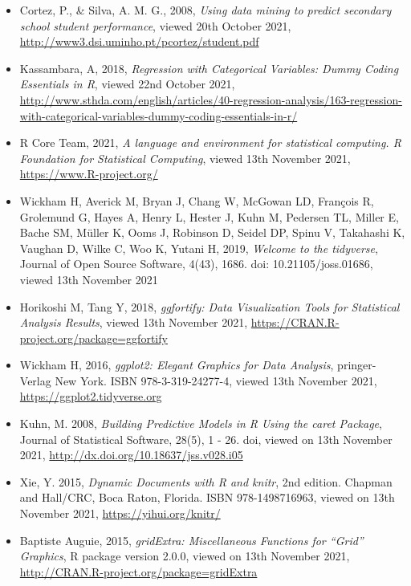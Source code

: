 \documentclass[letterpaper,9pt,twocolumn,twoside,]{pinp}
\begin{document}
\begin{itemize}
\item
  Cortez, P., \& Silva, A. M. G., 2008, \emph{Using data mining to
  predict secondary school student performance}, viewed 20th October
  2021, \url{http://www3.dsi.uminho.pt/pcortez/student.pdf}
\item
  Kassambara, A, 2018, \emph{Regression with Categorical Variables:
  Dummy Coding Essentials in R}, viewed 22nd October 2021,
  \url{http://www.sthda.com/english/articles/40-regression-analysis/163-regression-with-categorical-variables-dummy-coding-essentials-in-r/}
\item
  R Core Team, 2021, \emph{A language and environment for statistical
  computing. R Foundation for Statistical Computing}, viewed 13th
  November 2021, \url{https://www.R-project.org/}
\item
  Wickham H, Averick M, Bryan J, Chang W, McGowan LD, François R,
  Grolemund G, Hayes A, Henry L, Hester J, Kuhn M, Pedersen TL, Miller
  E, Bache SM, Müller K, Ooms J, Robinson D, Seidel DP, Spinu V,
  Takahashi K, Vaughan D, Wilke C, Woo K, Yutani H, 2019, \emph{Welcome
  to the tidyverse}, Journal of Open Source Software, 4(43), 1686. doi:
  10.21105/joss.01686, viewed 13th November 2021
\item
  Horikoshi M, Tang Y, 2018, \emph{ggfortify: Data Visualization Tools
  for Statistical Analysis Results}, viewed 13th November 2021,
  \url{https://CRAN.R-project.org/package=ggfortify}
\item
  Wickham H, 2016, \emph{ggplot2: Elegant Graphics for Data Analysis},
  pringer-Verlag New York. ISBN 978-3-319-24277-4, viewed 13th November
  2021, \url{https://ggplot2.tidyverse.org}
\item
  Kuhn, M. 2008, \emph{Building Predictive Models in R Using the caret
  Package}, Journal of Statistical Software, 28(5), 1 - 26. doi, viewed
  on 13th November 2021, \url{http://dx.doi.org/10.18637/jss.v028.i05}
\item
  Xie, Y. 2015, \emph{Dynamic Documents with R and knitr}, 2nd edition.
  Chapman and Hall/CRC, Boca Raton, Florida. ISBN 978-1498716963, viewed
  on 13th November 2021, \url{https://yihui.org/knitr/}
\item
  Baptiste Auguie, 2015, \emph{gridExtra: Miscellaneous Functions for
  ``Grid'' Graphics}, R package version 2.0.0, viewed on 13th November
  2021, \url{http://CRAN.R-project.org/package=gridExtra}
\end{itemize}





\end{document}
